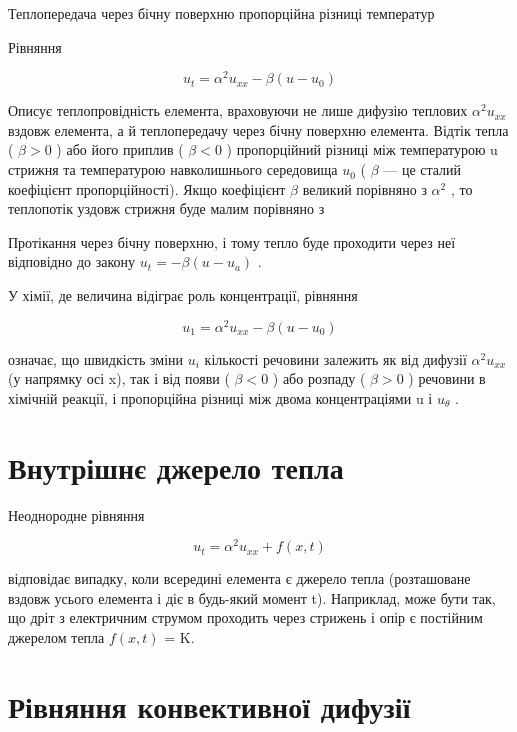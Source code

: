 \documentclass[
  ukrainian,
]{article}
\begin{document}
Теплопередача через бічну поверхню пропорційна різниці температур

Рівняння

\[
u_t = \alpha^2 u_{xx} - \beta (u - u_0)
\]

Описує теплопровідність елемента, враховуючи не лише дифузію теплових
\(\alpha^2 u_{xx}\) вздовж елемента, а й теплопередачу через бічну
поверхню елемента. Відтік тепла ( \(\beta > 0\) ) або його приплив (
\(\beta < 0\) ) пропорційний різниці між температурою u стрижня та
температурою навколишнього середовища \(u_0\) ( \(\beta\) --- це сталий
коефіцієнт пропорційності). Якщо коефіцієнт \(\beta\) великий порівняно
з \(\alpha^2\) , то теплопотік уздовж стрижня буде малим порівняно з

Протікання через бічну поверхню, і тому тепло буде проходити через неї
відповідно до закону \(u_t = -\beta (u - u_a)\) .

У хімії, де величина відіграє роль концентрації, рівняння

\[
u_1 = \alpha^2 u_{xx} - \beta (u - u_0)
\]

означає, що швидкість зміни \(u_i\) кількості речовини залежить як від
дифузії \(\alpha^2 u_{xx}\) (у напрямку осі x), так і від появи (
\(\beta < 0\) ) або розпаду ( \(\beta > 0\) ) речовини в хімічній
реакції, і пропорційна різниці між двома концентраціями u і
\(u_{\theta}\) .

\section{Внутрішнє джерело
тепла}\label{ux432ux43dux443ux442ux440ux456ux448ux43dux454-ux434ux436ux435ux440ux435ux43bux43e-ux442ux435ux43fux43bux430}

Неоднородне рівняння

\[
u_t = \alpha^2 u_{xx} + f(x, t)
\]

відповідає випадку, коли всередині елемента є джерело тепла (розташоване
вздовж усього елемента і діє в будь-який момент t). Наприклад, може бути
так, що дріт з електричним струмом проходить через стрижень і опір є
постійним джерелом тепла \(f(x,t)\) = K.

\section{Рівняння конвективної
дифузії}\label{ux440ux456ux432ux43dux44fux43dux43dux44f-ux43aux43eux43dux432ux435ux43aux442ux438ux432ux43dux43eux457-ux434ux438ux444ux443ux437ux456ux457}
\end{document}
